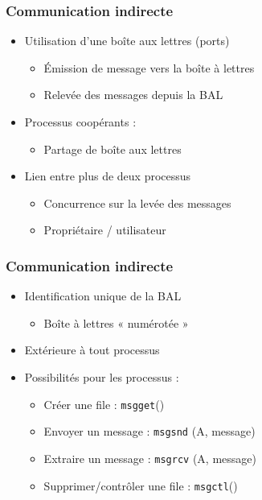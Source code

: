 \begin{frame}
\frametitle{Communication indirecte}
\begin{itemize}
\item Utilisation d’une boîte aux lettres (ports)
\begin{itemize}
\item Émission de message vers la boîte à lettres
\item Relevée des messages depuis la BAL
\end{itemize}
\item Processus coopérants :
\begin{itemize}
\item Partage de boîte aux lettres
\end{itemize}
\item Lien entre plus de deux processus
\begin{itemize}
\item Concurrence sur la levée des messages
\item Propriétaire / utilisateur
\end{itemize}
\end{itemize}
\end{frame}

\begin{frame}
\frametitle{Communication indirecte}
\begin{itemize}
\item Identification unique de la BAL
\begin{itemize}
\item Boîte à lettres « numérotée »
\end{itemize}
\item Extérieure à tout processus
\item Possibilités pour les processus :
\begin{itemize}
\item Créer une file : \texttt{msgget}()
\item Envoyer un message : \texttt{msgsnd} (A, message)
\item Extraire un message : \texttt{msgrcv} (A, message)
\item Supprimer/contrôler une file : \texttt{msgctl}()
\end{itemize}
\end{itemize}
\end{frame}

